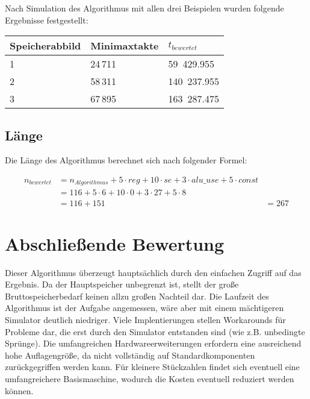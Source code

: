 Nach Simulation des Algorithmus mit allen drei Beispielen wurden folgende Ergebnisse festgestellt:

\begin{center}
    \begin{tabular}{|l|l|l|}
        \hline
        Speicherabbild & Minimaxtakte & $t_{bewertet}$ \\
        \hline
        \hline
        1 & 24\,711 & 59\ 429.955 \\
        \hline
        2 & 58\,311 & 140\ 237.955 \\
        \hline
        3 & 67\,895 & 163\ 287.475 \\
        \hline
    \end{tabular}
\end{center}

\subsection{Länge}
\label{subsection:Dokumentation-BenchmarkBewertung-Berechnung-Laenge}

Die Länge des Algorithmus berechnet sich nach folgender Formel:

\begin{align*}
    n_{bewertet} &= n_{Algorithmus} + 5 \cdot reg + 10 \cdot se + 3 \cdot alu\_use + 5 \cdot const \\
                 &= 116 + 5 \cdot 6 + 10 \cdot 0 + 3 \cdot 27 + 5 \cdot 8 \\
                 &= 116 + 151
                 &= 267
\end{align*}

\section{Abschließende Bewertung}
\label{section:Dokumentation-BenchmarkBewertung-Bewertung}

Dieser Algorithmus überzeugt hauptsächlich durch den einfachen Zugriff auf das Ergebnis. Da der Hauptspeicher unbegrenzt ist, stellt der große Bruttospeicherbedarf keinen allzu großen Nachteil dar. Die Laufzeit des Algorithmus ist der Aufgabe angemessen, wäre aber mit einem mächtigeren Simulator deutlich niedriger. Viele Implentierungen stellen Workarounds für Probleme dar, die erst durch den Simulator entstanden sind (wie z.B. unbedingte Sprünge). Die umfangreichen Hardwareerweiterungen erfordern eine ausreichend hohe Auflagengröße, da nicht vollständig auf Standardkomponenten zurückgegriffen werden kann. Für kleinere Stückzahlen findet sich eventuell eine umfangreichere Basismaschine, wodurch die Kosten eventuell reduziert werden können.


